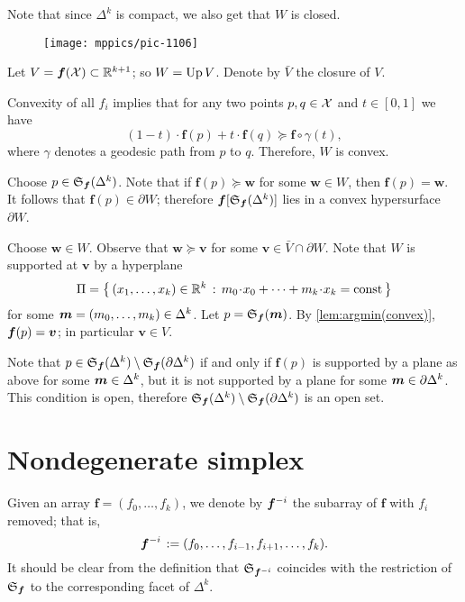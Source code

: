 Note that since $\Delta^k$ is compact, we also get that $W$ is closed.

\begin{wrapfigure}{r}{48mm}
\vskip0mm
\centering
\texttt{[image: mppics/pic-1106]}
\end{wrapfigure}

Let $V=\bm{f}(\mathcal{X})\subset\mathbb{R}^{k+1}$; so $W\z=\Up V$.
Denote by $\bar V$ the closure of $V$.

Convexity of all $f_i$ implies that
for any two points $p,q\in \mathcal{X}$ and $t\in[0,1]$ we have
\[(1-t)\cdot\bm{f}(p)+t\cdot \bm{f}(q)
\succcurlyeq
\bm{f}\circ\gamma(t),\]
where $\gamma$ denotes a geodesic path from $p$ to $q$. 
Therefore, $W$ is convex.

Choose $p\in \mathfrak{S}_{\bm{f}}(\Delta^k)$.
Note that if $\bm{f}(p)\succcurlyeq\bm{w}$ for some $\bm{w}\in W$, then $\bm{f}(p)=\bm{w}$.
It follows that $\bm{f}(p)\in\partial  W$;
therefore $\bm{f}[\mathfrak{S}_{\bm{f}}(\Delta^k)]$ lies in a convex hypersurface $\partial  W$.

Choose $\bm{w}\in W$.
Observe that $\bm{w}\succcurlyeq\bm{v}$ for some $\bm{v}\in \bar V\cap \partial W$.
Note that $W$ is supported at $\bm{v}$ by a hyperplane 
\[\Pi=\set{(x_1,\dots,x_k)\in \RR^k}{m_0\cdot x_0+\dots+m_k\cdot x_k=\const}\]
for some $\bm{m}=(m_0,\dots,m_k)\in\Delta^{k}$.
Let $p=\mathfrak{S}_{\bm f}(\bm m)$.
By \ref{lem:argmin(convex)}, $\bm{f}(p)\z=\bm{v}$;
in particular $\bm{v}\in V$.

Note that $p\in \mathfrak{S}_{\bm{f}}(\Delta^k)\setminus\mathfrak{S}_{\bm{f}}(\partial\Delta^k)$ if and only if 
$\bm{f}(p)$ is supported by a plane as above for some $\bm{m}\in\Delta^{k}$,
but it is not supported by a plane for some $\bm{m}\in\partial\Delta^{k}$.
This condition is open, therefore $\mathfrak{S}_{\bm{f}}(\Delta^k)\setminus\mathfrak{S}_{\bm{f}}(\partial\Delta^k)$ is an open set.
\qeds

\section{Nondegenerate simplex}

Given an array $\bm{f}=(f_0,\dots,f_k)$,
we denote by $\bm{f}^{{-} i}$ the subarray of $\bm{f}$ with $f_i$ removed;
that is, 
\[\bm{f}^{{-} i\,}
\mathrel{:=}
(f_0,\dots,f_{i-1},f_{i+1},\dots,f_k).\]
It should be clear from the definition that $\mathfrak{S}_{\bm{f}^{{-} i}}$ 
coincides with the restriction of $\mathfrak{S}_{\bm{f}}$ to the corresponding facet of $\Delta^k$.

